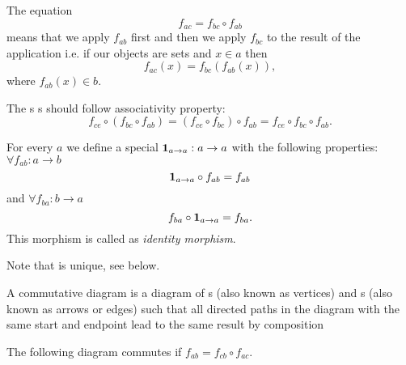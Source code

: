 \begin{remark}[Composition]
  \label{rem:composition}
  The equation
  \[
  f_{ac} = f_{bc} \circ f_{ab}
  \]
  means that we apply $f_{ab}$ first and then we apply $f_{bc}$ to the
  result of the application i.e. if our objects are sets and $x \in a$
  then 
  \[
  f_{ac} ( x ) = f_{bc} ( f_{ab} ( x ) ),
  \]
  where $f_{ab} ( x ) \in b$.
\end{remark}

\begin{axiom}[Associativity]
  \label{axm:associativity}
  The s s should
  follow associativity property:
  \[
  f_{ce} \circ (f_{bc} \circ f_{ab}) = (f_{ce} \circ f_{bc}) \circ
  f_{ab} = f_{ce} \circ f_{bc} \circ f_{ab}.
  \]
\end{axiom}

\begin{definition}
  \label{def:id}
  For every  $a$ we define a special
   $\mathbf{1}_{ a \to a } : a \rightarrow a$ with the
  following properties: $\forall f_{ab} : a \rightarrow b$
  \begin{equation}
    \mathbf{1}_{ a \to a } \circ f_{ab} = f_{ab}
    \label{eq:leftid}
  \end{equation}
  and
  $\forall f_{ba} : b \rightarrow a$
  \begin{equation}
    f_{ba} \circ \mathbf{1}_{ a \to a }  = f_{ba}.
    \label{eq:rightid}
  \end{equation}
  This morphism is called as \textit{identity morphism}.
\end{definition}

Note that  is unique, see
 below.

\begin{definition}
  A commutative diagram is a diagram of s (also known as
  vertices) and s (also known as arrows or
  edges) such that all directed paths in the diagram with the same
  start and endpoint lead to the same result by composition
  \label{def:commutative_diagram}

  The following diagram commutes if $f_{ab} = f_{cb} \circ f_{ac}$.

  \begin{center}
  \end{center}
\end{definition}


